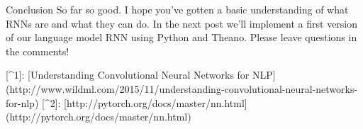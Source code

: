 Conclusion
So far so good. I hope you’ve gotten a basic understanding of what RNNs are and what they can do. In the next post we’ll implement a first version of our language model RNN using Python and Theano. Please leave questions in the comments!


[^1]: [Understanding Convolutional Neural Networks for NLP](http://www.wildml.com/2015/11/understanding-convolutional-neural-networks-for-nlp)
[^2]: [http://pytorch.org/docs/master/nn.html](http://pytorch.org/docs/master/nn.html)